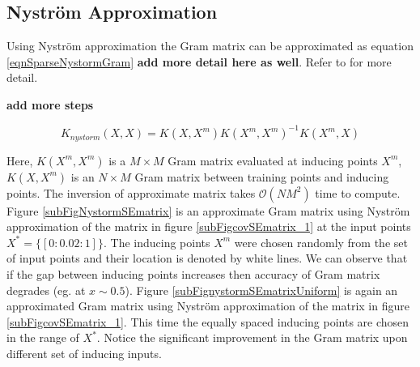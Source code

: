 \subsection{Nystr\"{o}m Approximation}\label{subSecNystrom} 

Using Nystr\"{o}m approximation the Gram matrix can be approximated as equation \ref{eqnSparseNystormGram} \textbf{add more detail here as well}. Refer to \cite{quinonero2005unifying, seeger2003fast} for more detail. 

\textbf{add more steps}

\begin{equation}\label{eqnSparseNystormGram}
K_{nystorm}(X, X) = K(X, X^{m})K(X^{m}, X^{m})^{-1}K(X^{m}, X)
\end{equation}

Here, $K(X^{m}, X^{m})$ is a $M \times M$ Gram matrix evaluated at inducing points $X^{m}$, $K(X, X^{m})$ is an $N \times M$ Gram matrix between training points and inducing points. The inversion of approximate matrix takes $\mathcal{O}\left ( NM^{2} \right )$ time to compute. Figure \ref{subFigNystormSEmatrix} is an approximate Gram matrix using Nystr\"{o}m approximation of the matrix in figure \ref{subFigcovSEmatrix_1} at the input points $X^{*} = \{[0:0.02:1]\}$. The inducing points $X^{m}$ were chosen randomly from the set of input points and their location is denoted by white lines. We can observe that if the gap between inducing points increases then accuracy of Gram matrix degrades (eg. at $x \sim 0.5$). Figure \ref{subFignystormSEmatrixUniform} is again an approximated Gram matrix using Nystr\"{o}m approximation of the matrix in figure \ref{subFigcovSEmatrix_1}. This time the equally spaced inducing points are chosen in the range of $X^{*}$. Notice the significant improvement in the Gram matrix upon different set of inducing inputs.

